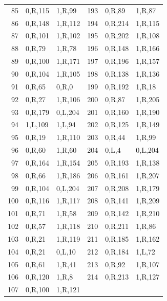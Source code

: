 \begin{longtable}{rll@{\hspace{12mm}}rll}
85 & 0,R,115 & 1,R,99 & 193 & 0,R,89 & 1,R,87\\
86 & 0,R,148 & 1,R,112 & 194 & 0,R,214 & 1,R,115\\
87 & 0,R,101 & 1,R,102 & 195 & 0,R,202 & 1,R,108\\
88 & 0,R,79 & 1,R,78 & 196 & 0,R,148 & 1,R,166\\
89 & 0,R,100 & 1,R,171 & 197 & 0,R,196 & 1,R,157\\
90 & 0,R,104 & 1,R,105 & 198 & 0,R,138 & 1,R,136\\
91 & 0,R,65 & 0,R,0 & 199 & 0,R,192 & 1,R,18\\
92 & 0,R,27 & 1,R,106 & 200 & 0,R,87 & 1,R,205\\
93 & 0,R,179 & 0,L,204 & 201 & 0,R,160 & 1,R,190\\
94 & 1,L,109 & 1,L,94 & 202 & 0,R,125 & 1,R,149\\
95 & 0,R,19 & 1,R,110 & 203 & 0,R,44 & 1,R,99\\
96 & 0,R,60 & 1,R,60 & 204 & 0,L,4 & 0,L,204\\
97 & 0,R,164 & 1,R,154 & 205 & 0,R,193 & 1,R,138\\
98 & 0,R,66 & 1,R,186 & 206 & 0,R,161 & 1,R,207\\
99 & 0,R,104 & 0,L,204 & 207 & 0,R,208 & 1,R,179\\
100 & 0,R,116 & 1,R,117 & 208 & 0,R,141 & 1,R,209\\
101 & 0,R,71 & 1,R,58 & 209 & 0,R,142 & 1,R,210\\
102 & 0,R,57 & 1,R,118 & 210 & 0,R,211 & 1,R,86\\
103 & 0,R,21 & 1,R,119 & 211 & 0,R,185 & 1,R,162\\
104 & 0,R,21 & 0,L,10 & 212 & 0,R,184 & 1,L,72\\
105 & 0,R,61 & 1,R,41 & 213 & 0,R,92 & 1,R,107\\
106 & 0,R,120 & 1,R,8 & 214 & 0,R,213 & 1,R,127\\
107 & 0,R,100 & 1,R,121 &  & & \\
\end{longtable}
\endgroup
